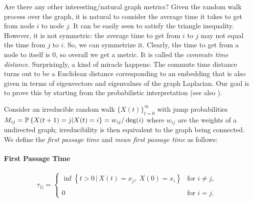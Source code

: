 Are there any other interesting/natural graph metrics? Given the random walk process over the graph, it is natural to consider the average time it takes to get from node $i$ to node $j$. It can be easily seen to satisfy the triangle inequality. However, it is not symmetric: the average time to get from $i$ to $j$ may not equal the time from $j$ to $i$. So, we can symmetrize it. Clearly, the time to get from a node to itself is 0, so overall we get a metric. It is called the {\em commute time distance}. Surprisingly, a kind of miracle happens: The commute time distance turns out to be a Euclidean distance corresponding to an embedding that is also given in terms of eigenvectors and eigenvalues of the graph Laplacian. Our goal is to prove this by starting from the probabilistic interpretation (see also \cite{doyle1984random,lovasz1993random}). 


Consider an irreducible random walk  $\{X(t)\}_{t=0}^\infty$ with jump probabilities $M_{ij} = {\mathbb{P}}\left\{ X(t+1) = j | X(t) = i   \right\} = w_{ij}/\deg(i)$ where $w_{ij}$ are the weights of a undirected graph; irreducibility is then equivalent to the graph being connected. We define the {\em first passage time} and {\em mean first passage time} as follows:

\paragraph*{First Passage Time}

\begin{equation}
\tau_{ij}=\left\{\begin{array}{cc}
                   \inf\left\{ t>0 \,|\, X(t)={x}_{j}, \; X(0)={x}_{i}\right\} & \mbox{for }
i\neq j, \\
&\\
                   0 & \mbox{for } i=j.
                 \end{array}
\right.
\end{equation}


